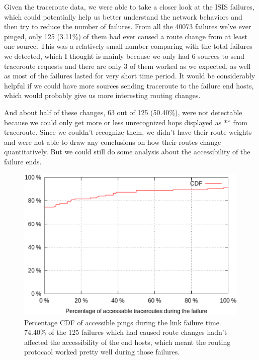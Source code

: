 \documentclass[conference, twocolumn, oneside, 10pt]{IEEEtran}
\begin{document}
Given the traceroute data, we were able to take a closer look at the ISIS failures, which could potentially help us better understand the network behaviors and then try to reduce the number of failures. From all the 40073 failures we've ever pinged, only 125 (3.11\%) of them had ever caused a route change from at least one source. This was a relatively small number comparing with the total failures we detected, which I thought is mainly because we only had 6 sources to send traceroute requests and there are only 3 of them worked as we expected, as well as most of the failures lasted for very short time period. It would be considerably helpful if we could have more sources sending traceroute to the failure end hosts, which would probably give us more interesting routing changes.

And about half of these changes, 63 out of 125 (50.40\%), were not detectable because we could only get more or less unrecognized hops displayed as ** from traceroute. Since we couldn't recognize them, we didn't have their route weights and were not able to draw any conclusions on how their routes change quantitatively. But we could still do some analysis about the accessibility of the failure ends.

\begin{figure}[h!]
\centering
\includegraphics[scale=0.4]{plot/accessibility.eps}
\caption{Percentage CDF of accessible pings during the link failure time. 74.40\% of the 125 failures which had caused route changes hadn't affected the accessibility of the end hosts, which meant the routing protocaol worked pretty well during those failures.}
\label{fig:accessibility}
\end{figure}
\end{document}

